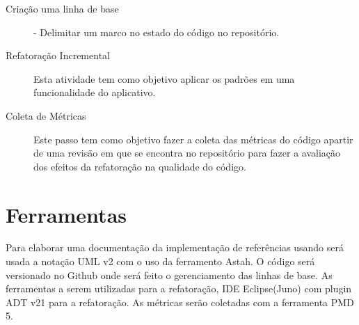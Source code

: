 \begin{description}
\item[Criação uma linha de base] - Delimitar um marco no estado do código no
repositório.
\item[Refatoração Incremental] Esta atividade tem como objetivo aplicar os
padrões em uma funcionalidade do aplicativo.
\item[Coleta de Métricas] Este passo tem como objetivo fazer a coleta
das métricas do código apartir de uma revisão em que se encontra no repositório
para fazer a avaliação dos efeitos da refatoração na qualidade do código.
\end{description}

\section{Ferramentas}

Para elaborar uma documentação da implementação de referências usando será usada
a notação UML v2 com o uso da ferramento Astah. O código será versionado no
Github onde será feito o gerenciamento das linhas de base. As ferramentas a
serem utilizadas para a refatoração, IDE Eclipse(Juno) com plugin ADT v21 para a
refatoração. As métricas serão coletadas com a ferramenta PMD 5.
